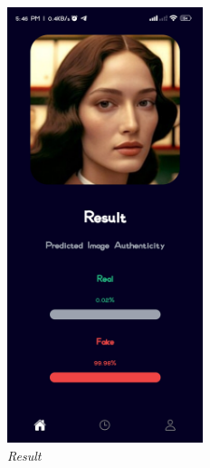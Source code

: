 \begin{figure}[ht]
    \centering
    \includegraphics[height= 5in]{img/resultfake.jpg}
    \caption{\textit{Result}}
\end{figure}